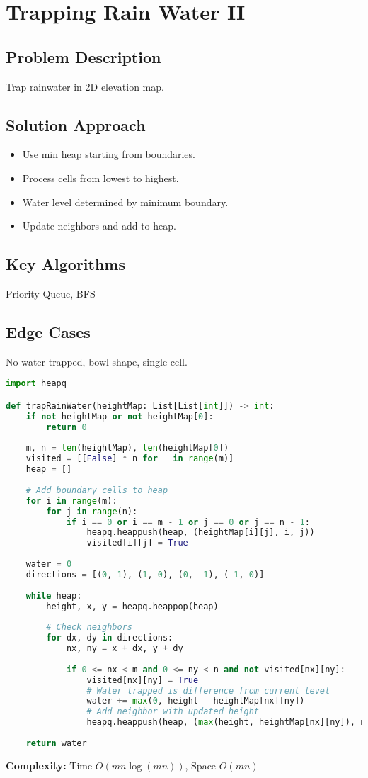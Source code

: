 \documentclass[10pt, a4paper]{article}
\begin{document}
\section{Trapping Rain Water II}
\subsection*{Problem Description}
Trap rainwater in 2D elevation map.

\subsection*{Solution Approach}
\begin{itemize}
    \item Use min heap starting from boundaries.
    \item Process cells from lowest to highest.
    \item Water level determined by minimum boundary.
    \item Update neighbors and add to heap.
\end{itemize}

\subsection*{Key Algorithms}
Priority Queue, BFS

\subsection*{Edge Cases}
No water trapped, bowl shape, single cell.

\begin{lstlisting}[language=Python]
import heapq

def trapRainWater(heightMap: List[List[int]]) -> int:
    if not heightMap or not heightMap[0]:
        return 0
    
    m, n = len(heightMap), len(heightMap[0])
    visited = [[False] * n for _ in range(m)]
    heap = []
    
    # Add boundary cells to heap
    for i in range(m):
        for j in range(n):
            if i == 0 or i == m - 1 or j == 0 or j == n - 1:
                heapq.heappush(heap, (heightMap[i][j], i, j))
                visited[i][j] = True
    
    water = 0
    directions = [(0, 1), (1, 0), (0, -1), (-1, 0)]
    
    while heap:
        height, x, y = heapq.heappop(heap)
        
        # Check neighbors
        for dx, dy in directions:
            nx, ny = x + dx, y + dy
            
            if 0 <= nx < m and 0 <= ny < n and not visited[nx][ny]:
                visited[nx][ny] = True
                # Water trapped is difference from current level
                water += max(0, height - heightMap[nx][ny])
                # Add neighbor with updated height
                heapq.heappush(heap, (max(height, heightMap[nx][ny]), nx, ny))
    
    return water
\end{lstlisting}
\textbf{Complexity:} Time $O(mn \log(mn))$, Space $O(mn)$
\end{document}
